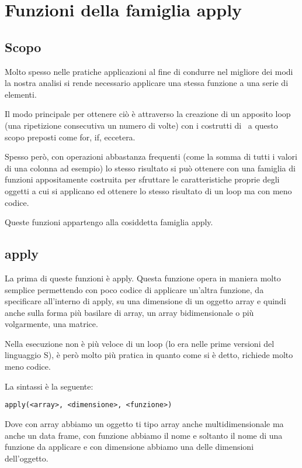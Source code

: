 \chapter{Funzioni della famiglia apply}
\section{Scopo}

Molto spesso nelle pratiche applicazioni  al fine di condurre nel migliore dei modi la nostra analisi si rende necessario applicare una stessa funzione a una serie di elementi.

Il modo principale per ottenere ciò è attraverso la creazione di un apposito loop (una ripetizione consecutiva un numero di volte) con i costrutti di \erre\ a questo scopo preposti come \textsf{for}, \textsf{if}, eccetera.

Spesso però, con operazioni abbastanza frequenti (come la somma di tutti i valori di una colonna ad esempio) lo stesso risultato si può ottenere con una famiglia di funzioni appositamente costruita per sfruttare le caratteristiche proprie degli oggetti a cui si applicano ed ottenere lo stesso risultato di un loop ma con meno codice.

Queste funzioni appartengo alla cosiddetta famiglia \textsf{apply}.

\section{apply}
La prima di queste funzioni è \textsf{apply}. Questa funzione opera in maniera molto semplice permettendo con poco codice di applicare un'altra funzione, da specificare all'interno di \textsf{apply}, su una dimensione di un oggetto array e quindi anche sulla forma più basilare di array, un array bidimensionale o più volgarmente, una matrice.

Nella esecuzione non è più veloce di un loop (lo era nelle prime versioni del linguaggio \textsf{S}), è però molto più pratica in quanto come si è detto, richiede molto meno codice.

La sintassi è la seguente:
\begin{lstlisting}
apply(<array>, <dimensione>, <funzione>)
\end{lstlisting}

Dove con array abbiamo un oggetto ti tipo array anche multidimensionale ma anche un data frame, con funzione abbiamo il nome e soltanto il nome di una funzione da applicare e con dimensione abbiamo una delle dimensioni dell'oggetto.

